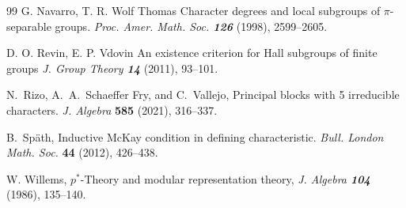 \documentclass[12pt,leqno,a4paper]{amsart}
\theoremstyle{remark}
\begin{document}
\begin{thebibliography}{99}
{\sc G. Navarro, T. R. Wolf}
 Thomas Character degrees and local subgroups of $\pi$-separable groups.
 \emph{ Proc. Amer. Math. Soc. \bf126} (1998),   2599--2605. 
 
 
{\sc D. O. Revin, E. P. Vdovin}
An existence criterion for Hall subgroups
of finite groups
 \emph{J. Group Theory \bf 14} (2011), 93--101.
 
{\sc N.~Rizo, A.~A.~Schaeffer Fry, and C.~Vallejo}, Principal blocks with 5 irreducible characters. \emph{J. Algebra} \textbf{585} (2021), 316--337.

{\sc B.~Sp{\"a}th}, Inductive McKay condition in defining characteristic.
\emph{Bull. London Math. Soc.} \textbf{44} (2012), 426--438.

 {\sc W. Willems}, $p^*$-Theory and modular representation theory, 
 \emph{J. Algebra \bf104} (1986), 135--140.

  \end{thebibliography}
\end{document}

